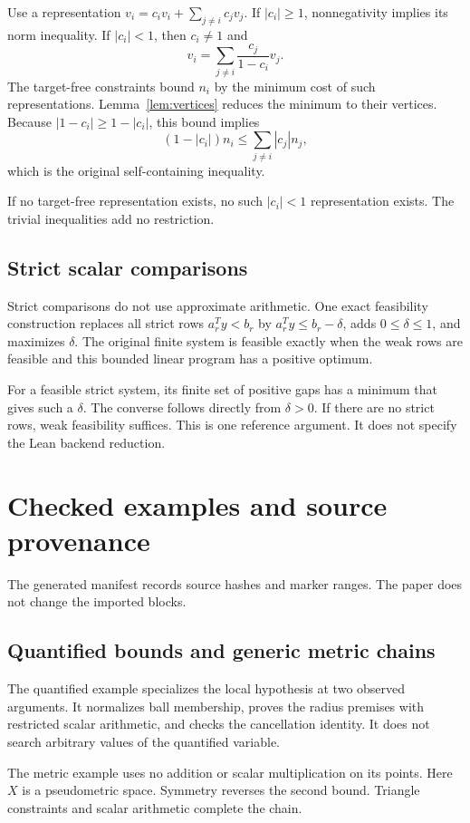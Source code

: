 Use a representation $v_i=c_iv_i+\sum_{j\ne i}c_jv_j$.
If $|c_i|\ge1$, nonnegativity implies its norm inequality.
If $|c_i|<1$, then $c_i\ne1$ and
\[
 v_i=\sum_{j\ne i}\frac{c_j}{1-c_i}v_j.
\]
The target-free constraints bound $n_i$ by the minimum cost of such representations.
Lemma~\ref{lem:vertices} reduces the minimum to their vertices.
Because $|1-c_i|\ge1-|c_i|$, this bound implies
\[
 (1-|c_i|)n_i\le\sum_{j\ne i}|c_j|n_j,
\]
which is the original self-containing inequality.

If no target-free representation exists, no such $|c_i|<1$ representation exists.
The trivial inequalities add no restriction.

\subsection{Strict scalar comparisons}
Strict comparisons do not use approximate arithmetic.
One exact feasibility construction replaces all strict rows $a_r^Ty<b_r$ by
$a_r^Ty\le b_r-\delta$, adds $0\le\delta\le1$, and maximizes $\delta$.
The original finite system is feasible exactly when the weak rows are feasible and this bounded linear program has a positive optimum.

For a feasible strict system, its finite set of positive gaps has a minimum that gives such a $\delta$.
The converse follows directly from $\delta>0$.
If there are no strict rows, weak feasibility suffices.
This is one reference argument.
It does not specify the Lean backend reduction.

\section{Checked examples and source provenance}\label{app:examples}

The generated manifest records source hashes and marker ranges.
The paper does not change the imported blocks.

\subsection{Quantified bounds and generic metric chains}
The quantified example specializes the local hypothesis at two observed arguments.
It normalizes ball membership, proves the radius premises with restricted scalar arithmetic, and checks the cancellation identity.
It does not search arbitrary values of the quantified variable.


The metric example uses no addition or scalar multiplication on its points.
Here $X$ is a pseudometric space.
Symmetry reverses the second bound.
Triangle constraints and scalar arithmetic complete the chain.


